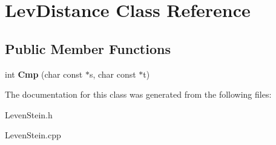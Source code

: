 \hypertarget{class_lev_distance}{\section{Lev\-Distance Class Reference}
\label{class_lev_distance}
}
\subsection*{Public Member Functions}
\begin{DoxyCompactItemize}
\item 
\hypertarget{class_lev_distance_ab210e2dfb6d8bdbc6c3d2425ffc922e1}{int {\bfseries Cmp} (char const $\ast$s, char const $\ast$t)}\label{class_lev_distance_ab210e2dfb6d8bdbc6c3d2425ffc922e1}

\end{DoxyCompactItemize}


The documentation for this class was generated from the following files\-:\begin{DoxyCompactItemize}
\item 
Leven\-Stein.\-h\item 
Leven\-Stein.\-cpp\end{DoxyCompactItemize}
